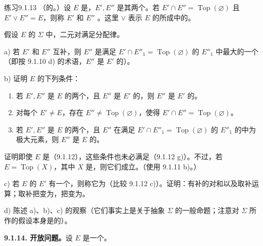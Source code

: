 \begin{SGAresult}{练习}{9.1.13}
（的。）设 $E$ 是，$E',E''$ 是其两个。若 $E'\cap E''=\operatorname{Top}(\varnothing)$ 且 $E'\vee E''=E$，则称 $E'$ 和 $E''$ 。这里 $\vee$ 表示 $E$ 的所成中的。

假设 $E$ 的 $\Sigma$ 中，二元对满足分配律。

a) 若 $E'$ 和 $E''$ 互补，则 $E''$ 是满足 $E'\cap E''_1=\operatorname{Top}(\varnothing)$ 的 $E''_1$ 中最大的一个（即按 9.1.10 d) 的术语，$E''$ 是 $E'$ 的）。

b) 证明 $E$ 的下列条件：
\begin{enumerate}
\item[(i)] 若 $E',E''$ 是 $E$ 的两个，且 $E''$ 是 $E'$ 的，则 $E''$ 是 $E'$ 的。
\item[(ii)] 对每个 $E'\ne E$，存在 $E''\ne\operatorname{Top}(\varnothing)$，使得 $E'\cap E''=\operatorname{Top}(\varnothing)$。
\item[(i bis)] 若 $E',E''$ 是 $E$ 的两个，且 $E''$ 在满足 $E'\cap E''_1=\operatorname{Top}(\varnothing)$ 的 $E''_1$ 的中为极大元素，则 $E''$ 是 $E$ 的。
\end{enumerate}
证明即使 $E$ 是（9.1.12），这些条件也未必满足（9.1.12 g)）。不过，若 $E=\operatorname{Top}(X)$，其中 $X$ 是，则它们成立。（使用 9.1.11 b)。）

c) 若 $E$ 的 $E'$ 有一个，则称它为（比较 9.1.12 c)）。证明：有补的对和以及取补运算；取补把变为，把变为。

d) 陈述 a)、b)、c) 的观察（它们事实上是关于抽象 $\Sigma$ 的一般命题；注意对 $\Sigma$ 所作的假设本身是的）。
\end{SGAresult}
\textbf{9.1.14. 开放问题。}设 $E$ 是一个。

